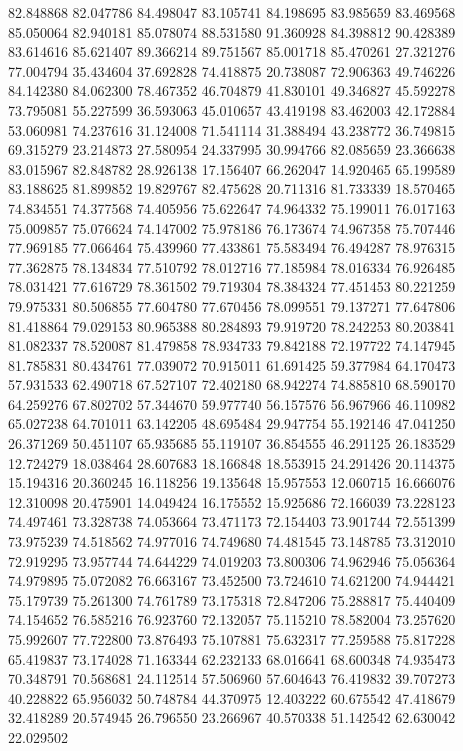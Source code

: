 82.848868
82.047786
84.498047
83.105741
84.198695
83.985659
83.469568
85.050064
82.940181
85.078074
88.531580
91.360928
84.398812
90.428389
83.614616
85.621407
89.366214
89.751567
85.001718
85.470261
27.321276
77.004794
35.434604
37.692828
74.418875
20.738087
72.906363
49.746226
84.142380
84.062300
78.467352
46.704879
41.830101
49.346827
45.592278
73.795081
55.227599
36.593063
45.010657
43.419198
83.462003
42.172884
53.060981
74.237616
31.124008
71.541114
31.388494
43.238772
36.749815
69.315279
23.214873
27.580954
24.337995
30.994766
82.085659
23.366638
83.015967
82.848782
28.926138
17.156407
66.262047
14.920465
65.199589
83.188625
81.899852
19.829767
82.475628
20.711316
81.733339
18.570465
74.834551
74.377568
74.405956
75.622647
74.964332
75.199011
76.017163
75.009857
75.076624
74.147002
75.978186
76.173674
74.967358
75.707446
77.969185
77.066464
75.439960
77.433861
75.583494
76.494287
78.976315
77.362875
78.134834
77.510792
78.012716
77.185984
78.016334
76.926485
78.031421
77.616729
78.361502
79.719304
78.384324
77.451453
80.221259
79.975331
80.506855
77.604780
77.670456
78.099551
79.137271
77.647806
81.418864
79.029153
80.965388
80.284893
79.919720
78.242253
80.203841
81.082337
78.520087
81.479858
78.934733
79.842188
72.197722
74.147945
81.785831
80.434761
77.039072
70.915011
61.691425
59.377984
64.170473
57.931533
62.490718
67.527107
72.402180
68.942274
74.885810
68.590170
64.259276
67.802702
57.344670
59.977740
56.157576
56.967966
46.110982
65.027238
64.701011
63.142205
48.695484
29.947754
55.192146
47.041250
26.371269
50.451107
65.935685
55.119107
36.854555
46.291125
26.183529
12.724279
18.038464
28.607683
18.166848
18.553915
24.291426
20.114375
15.194316
20.360245
16.118256
19.135648
15.957553
12.060715
16.666076
12.310098
20.475901
14.049424
16.175552
15.925686
72.166039
73.228123
74.497461
73.328738
74.053664
73.471173
72.154403
73.901744
72.551399
73.975239
74.518562
74.977016
74.749680
74.481545
73.148785
73.312010
72.919295
73.957744
74.644229
74.019203
73.800306
74.962946
75.056364
74.979895
75.072082
76.663167
73.452500
73.724610
74.621200
74.944421
75.179739
75.261300
74.761789
73.175318
72.847206
75.288817
75.440409
74.154652
76.585216
76.923760
72.132057
75.115210
78.582004
73.257620
75.992607
77.722800
73.876493
75.107881
75.632317
77.259588
75.817228
65.419837
73.174028
71.163344
62.232133
68.016641
68.600348
74.935473
70.348791
70.568681
24.112514
57.506960
57.604643
76.419832
39.707273
40.228822
65.956032
50.748784
44.370975
12.403222
60.675542
47.418679
32.418289
20.574945
26.796550
23.266967
40.570338
51.142542
62.630042
22.029502
